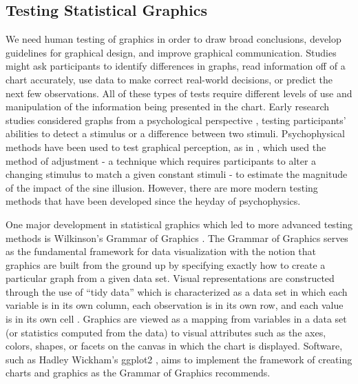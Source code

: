 \documentclass[12pt]{article}
\begin{document}
\hypertarget{testing-statistical-graphics}{%
\subsection{Testing Statistical
Graphics}\label{testing-statistical-graphics}}

We need human testing of graphics in order to draw broad conclusions,
develop guidelines for graphical design, and improve graphical
communication. Studies might ask participants to identify differences in
graphs, read information off of a chart accurately, use data to make
correct real-world decisions, or predict the next few observations. All
of these types of tests require different levels of use and manipulation
of the information being presented in the chart. Early research studies
considered graphs from a psychological perspective
\citep{spence1990visual, lewandowsky1989perception}, testing
participants' abilities to detect a stimulus or a difference between two
stimuli. Psychophysical methods have been used to test graphical
perception, as in \citet{vanderplas2015signs}, which used the method of
adjustment - a technique which requires participants to alter a changing
stimulus to match a given constant stimuli \citep{gescheider_1997}- to
estimate the magnitude of the impact of the sine illusion. However,
there are more modern testing methods that have been developed since the
heyday of psychophysics.

One major development in statistical graphics which led to more advanced
testing methods is Wilkinson's Grammar of Graphics
\citep{wilkinson2013grammar}. The Grammar of Graphics serves as the
fundamental framework for data visualization with the notion that
graphics are built from the ground up by specifying exactly how to
create a particular graph from a given data set. Visual representations
are constructed through the use of ``tidy data'' which is characterized
as a data set in which each variable is in its own column, each
observation is in its own row, and each value is in its own cell
\citep{wickham2016r}. Graphics are viewed as a mapping from variables in
a data set (or statistics computed from the data) to visual attributes
such as the axes, colors, shapes, or facets on the canvas in which the
chart is displayed. Software, such as Hadley Wickham's ggplot2
\citep{wickham2011ggplot2}, aims to implement the framework of creating
charts and graphics as the Grammar of Graphics recommends.
\end{document}
